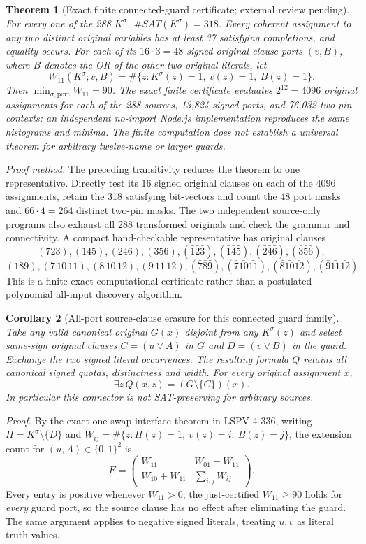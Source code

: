\documentclass[11pt]{article}
\newtheorem{theorem}{Theorem}
\newtheorem{corollary}[theorem]{Corollary}
\begin{document}
\begin{theorem}[Exact finite connected-guard certificate; external review pending]
For every one of the 288 $K^\sigma$, $\#SAT(K^\sigma)=318$. Every coherent assignment to any two distinct original variables has at least 37 satisfying completions, and equality occurs. For each of its $16\cdot3=48$ signed original-clause ports $(v,B)$, where $B$ denotes the OR of the other two original literals, let
\[
 W_{11}(K^\sigma;v,B)=\#\{z:K^\sigma(z)=1,\ v(z)=1,\ B(z)=1\}.
\]
Then $\min_{\sigma,\text{port}}W_{11}=90$. The exact finite certificate evaluates $2^{12}=4096$ original assignments for each of the 288 sources, 13,824 signed ports, and 76,032 two-pin contexts; an independent no-import Node.js implementation reproduces the same histograms and minima. The finite computation does not establish a universal theorem for arbitrary twelve-name or larger guards.
\end{theorem}
\noindent\emph{Proof method.} The preceding transitivity reduces the theorem to one representative. Directly test its 16 signed original clauses on each of the 4096 assignments, retain the 318 satisfying bit-vectors and count the 48 port masks and $66\cdot4=264$ distinct two-pin masks. The two independent source-only programs also exhaust all 288 transformed originals and check the grammar and connectivity. A compact hand-checkable representative has original clauses
\[
(723),(145),(246),(356),(\bar1\bar2\bar3),(\bar1\bar4\bar5),(\bar2\bar4\bar6),(\bar3\bar5\bar6),
\]
\[
(189),(7\,10\,11),(8\,10\,12),(9\,11\,12),
(\bar7\bar8\bar9),(\bar7\bar{10}\bar{11}),(\bar8\bar{10}\bar{12}),(\bar9\bar{11}\bar{12}).
\]
This is a finite exact computational certificate rather than a postulated polynomial all-input discovery algorithm.

\begin{corollary}[All-port source-clause erasure for this connected guard family]
Take any valid canonical original $G(x)$ disjoint from any $K^\sigma(z)$ and select same-sign original clauses $C=(u\vee A)$ in $G$ and $D=(v\vee B)$ in the guard. Exchange the two signed literal occurrences. The resulting formula $Q$ retains all canonical signed quotas, distinctness and width. For \emph{every} original assignment $x$,
\[
\boxed{\exists z\,Q(x,z)=(G\setminus\{C\})(x).}
\]
In particular this connector is not SAT-preserving for arbitrary sources.
\end{corollary}
\noindent\emph{Proof.} By the exact one-swap interface theorem in LSPV-4 336, writing $H=K^\sigma\setminus\{D\}$ and $W_{ij}=\#\{z:H(z)=1,\ v(z)=i,\ B(z)=j\}$, the extension count for $(u,A)\in\{0,1\}^2$ is
\[
 E=\begin{pmatrix}W_{11}&W_{01}+W_{11}\\
 W_{10}+W_{11}&\sum_{i,j}W_{ij}\end{pmatrix}.
\]
Every entry is positive whenever $W_{11}>0$; the just-certified $W_{11}\ge90$ holds for \emph{every} guard port, so the source clause has no effect after eliminating the guard. The same argument applies to negative signed literals, treating $u,v$ as literal truth values.
\end{document}
